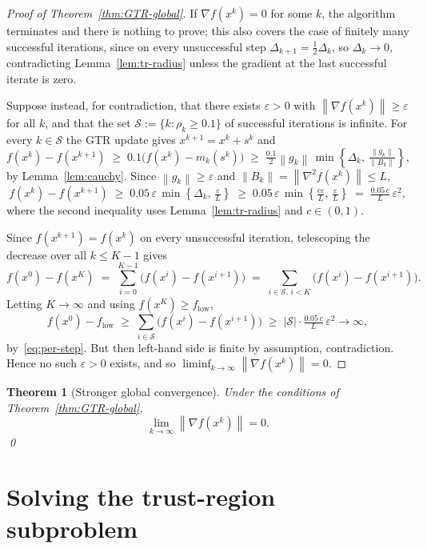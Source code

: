 \documentclass[11pt,a4paper]{report}
\theoremstyle{plain}
\newtheorem{theorem}{Theorem}[chapter]
\theoremstyle{definition}
\newcommand{\norm}[1]{\left\lVert#1\right\rVert}
\newcommand{\grad}{\nabla}
\newcommand{\eps}{\varepsilon}
\begin{document}
\begin{proof}[Proof of Theorem~\ref{thm:GTR-global}]
If $\grad f(x^{k})=0$ for some $k$, the algorithm terminates and there is
nothing to prove; this also covers the case of finitely many successful
iterations, since on every unsuccessful step $\Delta_{k+1}=\tfrac12\Delta_{k}$,
so $\Delta_{k}\to 0$, contradicting Lemma~\ref{lem:tr-radius} unless the
gradient at the last successful iterate is zero.

Suppose instead, for contradiction, that there exists $\eps>0$ with
$\norm{\grad f(x^{k})}\ge\eps$ for all $k$, and that the set
$\mathcal{S}:=\{k:\rho_{k}\ge 0.1\}$ of successful iterations is infinite.
For every $k\in\mathcal{S}$ the GTR update gives $x^{k+1}=x^{k}+s^{k}$ and
\[
f(x^{k})-f(x^{k+1})
    \;\ge\;0.1\bigl(f(x^{k})-m_{k}(s^{k})\bigr)
    \;\ge\;\tfrac{0.1}{2}\norm{g_{k}}\,
        \min\!\left\{\Delta_{k},\,\tfrac{\norm{g_{k}}}{\norm{B_{k}}}\right\},
\]
by Lemma~\ref{lem:cauchy}. Since $\norm{g_{k}}\ge\eps$ and
$\norm{B_{k}}=\norm{\grad^{2}f(x^{k})}\le L$,
\[
f(x^{k})-f(x^{k+1})
    \;\ge\;0.05\,\eps\,\min\!\left\{\Delta_{k},\,\tfrac{\eps}{L}\right\}
    \;\ge\;0.05\,\eps\,\min\!\left\{\tfrac{c\eps}{L},\,\tfrac{\eps}{L}\right\}
    \;=\;\tfrac{0.05\,c}{L}\,\eps^{2},
\tag{$\ast$}\label{eq:per-step}
\]
where the second inequality uses Lemma~\ref{lem:tr-radius} and $c\in(0,1)$.

Since $f(x^{k+1})=f(x^{k})$ on every unsuccessful iteration, telescoping the
decrease over all $k\le K-1$ gives
\[
f(x^{0})-f(x^{K})
    \;=\;\sum_{i=0}^{K-1}\!\bigl(f(x^{i})-f(x^{i+1})\bigr)
    \;=\;\sum_{i\in\mathcal{S},\,i<K}\!\bigl(f(x^{i})-f(x^{i+1})\bigr).
\]
Letting $K\to\infty$ and using $f(x^{K})\ge f_{\mathrm{low}}$,
\[
f(x^{0})-f_{\mathrm{low}}
  \;\ge\;\sum_{i\in\mathcal{S}}\bigl(f(x^{i})-f(x^{i+1})\bigr)
  \;\ge\;|\mathcal{S}|\cdot\tfrac{0.05\,c}{L}\,\eps^{2} \to \infty,
\tag{$\ast\ast$}\label{eq:telescoped}
\]
by~\eqref{eq:per-step}. But then left-hand side is finite by assumption, contradiction. Hence no such $\eps>0$ exists, and so $\liminf_{k\to\infty}\norm{\grad f(x^{k})}=0$.
\end{proof}

\begin{theorem}[Stronger global convergence]\label{thm:GTR-lim}
Under the conditions of Theorem~\ref{thm:GTR-global},
\[
  \lim_{k\to\infty}\norm{\grad f(x^{k})}=0.
\]
\qed
\end{theorem}

\section{Solving the trust-region subproblem}
\end{document}
